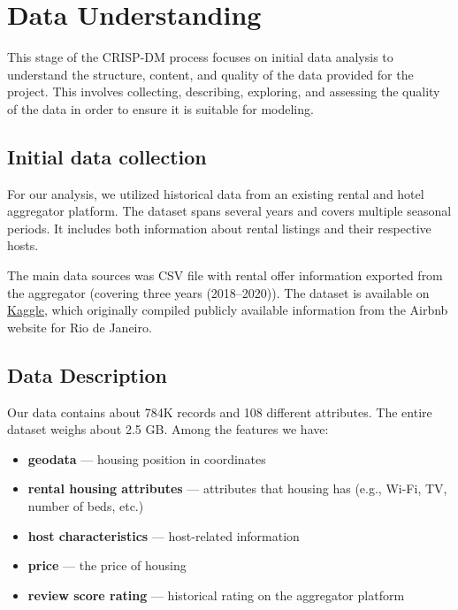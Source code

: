 

\section{Data Understanding}\label{chap:dataUnderstanding}
This stage of the CRISP-DM process focuses on initial data analysis to understand the structure, content, and quality of the data provided for the project. This involves collecting, describing, exploring, and assessing the quality of the data in order to ensure it is suitable for modeling.

\subsection{Initial data collection }\label{sec:initialDataCollection}
For our analysis, we utilized historical data from an existing rental and hotel aggregator platform. The dataset spans several years and covers multiple seasonal periods. It includes both information about rental listings and their respective hosts.

The main data sources was CSV file with rental offer information exported from the aggregator (covering three years (2018--2020)). The dataset is available on \href{https://www.kaggle.com/datasets/hazujaf/airbnb-price-prediction-in-rio-de-janeiro-python?resource=download}{Kaggle}\cite{airbnb_rio_kaggle}, which originally compiled publicly available information from the Airbnb website for Rio de Janeiro.

\subsection{Data Description }\label{sec:dataDescription}
Our data contains about 784K records and 108 different attributes. The entire dataset weighs about 2.5 GB.
Among the features we have:
\begin{itemize}
    \item \textbf{geodata} --- housing position in coordinates
    \item \textbf{rental housing attributes} --- attributes that housing has (e.g., Wi-Fi, TV, number of beds, etc.)
    \item \textbf{host characteristics} --- host-related information
    \item \textbf{price} --- the price of housing
    \item \textbf{review score rating} --- historical rating on the aggregator platform
\end{itemize}

